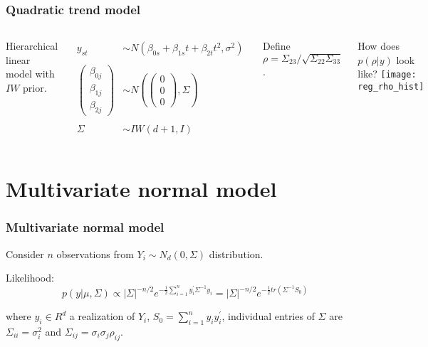 \documentclass[9pt]{beamer}\usepackage[]{graphicx}\usepackage[]{color}
\begin{document}
\begin{frame}
\frametitle{Quadratic trend model}
  \begin{columns}[T] %


Hierarchical linear model with $IW$ prior. 

\[\begin{array}{cl}
y_{st}  & \sim  N(\beta_{0s} + \beta_{1s} t + \beta_{2t}t^2, \sigma^2) \\
& \\
\begin{pmatrix} \beta_{0j} \\ \beta_{1j} \\ \beta_{2j} \end{pmatrix} & \sim  N \left( \begin{pmatrix} 0 \\ 0 \\ 0 \end{pmatrix} , \Sigma \right) \\
& \\
\Sigma & \sim  IW(d+1, I)
\end{array}
\]

Define $\rho = \Sigma_{23}/\sqrt{\Sigma_{22}\Sigma_{33}}$. 

  \pause
  How does $p(\rho| y)$ look like?
    \texttt{[image: reg\_rho\_hist]}
  \end{columns}
\end{frame}

\section{Multivariate normal model } 
\begin{frame}
\frametitle{Multivariate normal model }
Consider $n$ observations from $Y_i \sim N_d(0, \Sigma)$ distribution. 
\vspace{.5cm}

Likelihood: 
\[
p(y\vert \mu,\Sigma) \propto |\Sigma|^{-n/2} e^{- \frac{1}{2} \sum_{i=1}^n y_i^{'} \Sigma^{-1} y_i  } = |\Sigma|^{-n/2} e^{- \frac{1}{2}  tr(\Sigma^{-1}S_0)  } 
 \]
 \vspace{.5cm}
 
where $y_i \in R^d$ a realization of $Y_i$,  $S_0=\sum_{i=1}^n y_i y_i ^{'}$, individual entries of $\Sigma$ are $\Sigma_{ii} = \sigma_i^2$ and $\Sigma_{ij} = \sigma_i\sigma_j\rho_{ij}$. 
\end{frame}
\end{document}
